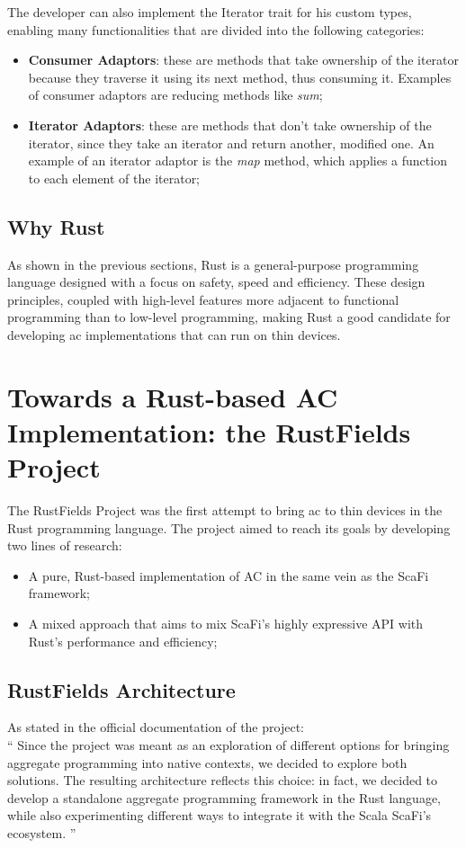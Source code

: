 The developer can also implement the Iterator trait for his custom types, enabling many functionalities that are divided into the following categories:

\begin{itemize}
    \item \textbf{Consumer Adaptors}: these are methods that take ownership of the iterator because they traverse it using its next method, thus consuming it. Examples of consumer adaptors are reducing methods like \textit{sum};
    \item \textbf{Iterator Adaptors}: these are methods that don't take ownership of the iterator, since they take an iterator and return another, modified one. An example of an iterator adaptor is the \textit{map} method, which applies a function to each element of the iterator;
\end{itemize}

\subsection{Why Rust}
As shown in the previous sections, Rust is a general-purpose programming language designed with a focus on safety, speed and efficiency. These design principles, coupled with high-level features
more adjacent to functional programming than to low-level programming, making Rust a good candidate for developing \ac{ac} implementations that can run on thin devices.


\section{Towards a Rust-based AC Implementation: the RustFields Project}
The RustFields Project\cite{001} was the first attempt to bring \ac{ac} to thin devices in the Rust programming language. The project aimed to reach its goals by developing two lines of research:
\begin{itemize}
    \item A pure, Rust-based implementation of AC in the same vein as the ScaFi framework;
    \item A mixed approach that aims to mix ScaFi's highly expressive API with Rust's performance and efficiency;
\end{itemize}

\subsection{RustFields Architecture}
As stated in the official documentation of the project: \\
``    Since the project was meant as an exploration of different options for bringing aggregate programming into native contexts, we decided to explore both solutions. The resulting architecture reflects this choice: in fact, we decided to develop a standalone aggregate programming framework in the Rust language, while also experimenting different ways to integrate it with the Scala ScaFi’s ecosystem.
''

